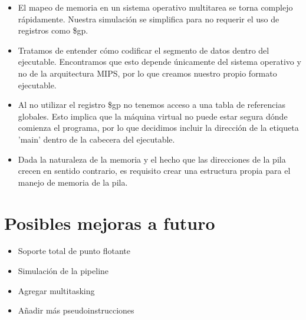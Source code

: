 \documentclass[12pt]{article}
\begin{document}
\begin{itemize}

\item	El mapeo de memoria en un sistema operativo multitarea se torna complejo rápidamente. Nuestra simulación se simplifica para no requerir el uso de registros como \$gp. %

\item	Tratamos de entender cómo codificar el segmento de datos dentro del ejecutable. Encontramos que esto depende únicamente del sistema operativo y no de la arquitectura MIPS, por lo que creamos nuestro propio formato ejecutable. %

\item	Al no utilizar el registro \$gp no tenemos acceso a una tabla de referencias globales. Esto implica que la máquina virtual no puede estar segura dónde comienza el programa, por lo que decidimos incluir la dirección de la etiqueta 'main' dentro de la cabecera del ejecutable.



\item	Dada la naturaleza de la memoria y el hecho que las direcciones de la pila crecen en sentido contrario, es requisito crear una estructura propia para el manejo de memoria de la pila.

\end{itemize}



\section{Posibles mejoras a futuro}

\begin{itemize}

\item Soporte total de punto flotante

\item Simulación de la pipeline

\item Agregar multitasking

\item Añadir más pseudoinstrucciones

\end{itemize}
\end{document}
